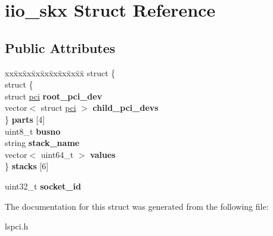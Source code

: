 \hypertarget{structiio__skx}{}\section{iio\+\_\+skx Struct Reference}
\label{structiio__skx}
\subsection*{Public Attributes}
\begin{DoxyCompactItemize}
\item 
\mbox{\label{structiio__skx_af65224d4b81ac82ae65de48cfa35b5cb}} 
\begin{tabbing}
xx\=xx\=xx\=xx\=xx\=xx\=xx\=xx\=xx\=\kill
struct \{\\
\>struct \{\\
\>\>struct \mbox{\hyperlink{structpci}{pci}} {\bfseries root\_pci\_dev}\\
\>\>vector$<$ struct \mbox{\hyperlink{structpci}{pci}} $>$ {\bfseries child\_pci\_devs}\\
\>\} {\bfseries parts} \mbox{[}4\mbox{]}\\
\>uint8\_t {\bfseries busno}\\
\>string {\bfseries stack\_name}\\
\>vector$<$ uint64\_t $>$ {\bfseries values}\\
\} {\bfseries stacks} \mbox{[}6\mbox{]}\\

\end{tabbing}\item 
\mbox{\label{structiio__skx_ad384eb7a01209cddfffbdb7424740bd9}} 
uint32\+\_\+t {\bfseries socket\+\_\+id}
\end{DoxyCompactItemize}


The documentation for this struct was generated from the following file\+:\begin{DoxyCompactItemize}
\item 
lspci.\+h\end{DoxyCompactItemize}

